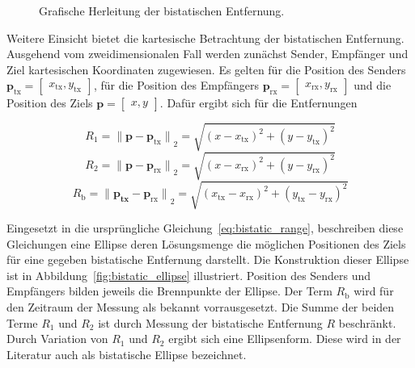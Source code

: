 \begin{figure}[htb]
{
    }
    \caption{Grafische Herleitung der bistatischen Entfernung.}\label{fig:bistatic_range}
\end{figure}

Weitere Einsicht bietet die kartesische Betrachtung der bistatischen Entfernung. Ausgehend vom zweidimensionalen Fall werden zunächst Sender, Empfänger und Ziel kartesischen Koordinaten zugewiesen. Es gelten für die Position des Senders \(\boldsymbol{p}_\text{tx} = \begin{bmatrix} x_\text{tx}, y_\text{tx} \end{bmatrix}\), für die Position des Empfängers \(\boldsymbol{p}_\text{rx} = \begin{bmatrix} x_\text{rx}, y_\text{rx} \end{bmatrix}\) und die Position des Ziels \(\boldsymbol{p} = \begin{bmatrix} x, y \end{bmatrix}\). Dafür ergibt sich für die Entfernungen

\begin{equation}
    R_1 = {\lVert \boldsymbol{p} - \boldsymbol{p}_\text{tx} \rVert}_2 = \sqrt{{(x - x_\text{tx})}^2 + {(y - y_\text{tx})}^2}
\end{equation}
\begin{equation}
    R_2 = {\lVert \boldsymbol{p} - \boldsymbol{p}_\text{rx} \rVert}_2 = \sqrt{{(x - x_\text{rx})}^2 + {(y - y_\text{rx})}^2}
\end{equation}
\begin{equation}
    R_\text{b} = {\lVert \boldsymbol{p_\text{tx}} - \boldsymbol{p}_\text{rx} \rVert}_2 = \sqrt{{(x_\text{tx} - x_\text{rx})}^2 + {(y_\text{tx} - y_\text{rx})}^2}
\end{equation}

Eingesetzt in die ursprüngliche Gleichung~\ref{eq:bistatic_range}, beschreiben diese Gleichungen eine Ellipse deren Lösungsmenge die möglichen Positionen des Ziels für eine gegeben bistatische Entfernung darstellt. Die Konstruktion dieser Ellipse ist in Abbildung~\ref{fig:bistatic_ellipse} illustriert. Position des Senders und Empfängers bilden jeweils die Brennpunkte der Ellipse. Der Term \(R_\text{b}\) wird für den Zeitraum der Messung als bekannt vorrausgesetzt. Die Summe der beiden Terme \(R_1\) und \(R_2\) ist durch Messung der bistatische Entfernung \(R\) beschränkt. Durch Variation von \(R_1\) und \(R_2\) ergibt sich eine Ellipsenform. Diese wird in der Literatur auch als bistatische Ellipse bezeichnet.

